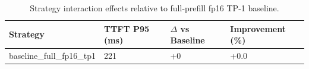 \begin{table}
\caption{Strategy interaction effects relative to full-prefill fp16 TP-1 baseline.}
\label{tab:interactions}
\begin{tabular}{llll}
\toprule
Strategy & TTFT P95 (ms) & $\Delta$ vs Baseline & Improvement (\%) \\
\midrule
baseline\_full\_fp16\_tp1 & 221 & +0 & +0.0 \\
\bottomrule
\end{tabular}
\end{table}
